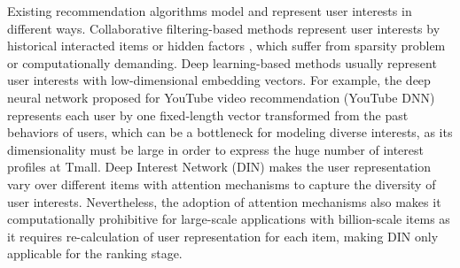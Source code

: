 \documentclass[sigconf]{acmart}
\begin{document}
Existing recommendation algorithms model and represent user interests in different ways.
Collaborative filtering-based methods represent user interests by historical interacted items \cite{sarwar2001item} or hidden factors \cite{koren2009matrix}, which suffer from sparsity problem or computationally demanding.
Deep learning-based methods usually represent user interests with low-dimensional embedding vectors.
For example, the deep neural network proposed for YouTube video recommendation (YouTube DNN) \cite{covington2016deep} represents each user by one fixed-length vector transformed from the
past behaviors of users, which can be a bottleneck for modeling diverse interests, as its dimensionality must be large in order to express the huge number of interest profiles at Tmall.
Deep Interest Network (DIN)\cite{zhou2018deep} makes the user representation vary over different items with attention mechanisms to capture the diversity of user interests.
Nevertheless, the adoption of attention mechanisms also makes it computationally prohibitive for large-scale applications with billion-scale items as it requires re-calculation of user representation for each item, making DIN only applicable for the ranking stage.
\end{document}
